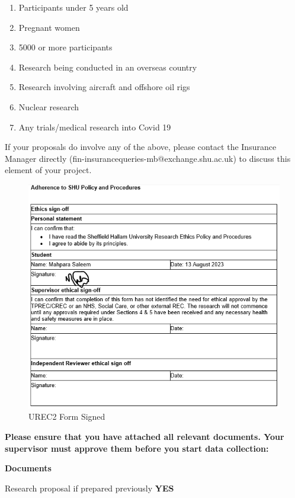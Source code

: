 \documentclass{article}
\begin{document}
\begin{enumerate}
    \item Participants under 5 years old
    \item Pregnant women
    \item 5000 or more participants
    \item Research being conducted in an overseas country
    \item Research involving aircraft and offshore oil rigs
    \item Nuclear research
    \item Any trials/medical research into Covid 19
\end{enumerate}

If your proposals do involve any of the above, please contact the Insurance Manager directly (fin-insurancequeries-mb@exchange.shu.ac.uk) to discuss this element of your project. 

\begin{figure}[ht!]
    \centering
    \includegraphics[scale=0.7]{urec2-signed}
    \caption{UREC2 Form Signed}
    \label{fig:urec2-signatures}
\end{figure}

\textbf{Please ensure that you have attached all relevant documents. Your supervisor must approve them before you start data collection:}

\textbf{Documents}

Research proposal if prepared previously \textbf{YES}
\end{document}
